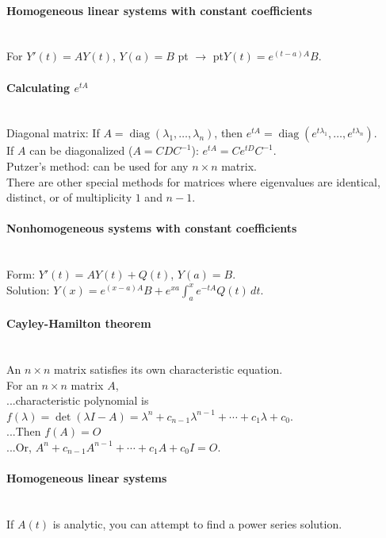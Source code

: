\documentclass[10pt]{article}
\DeclareMathOperator{\diag}{diag}
\def\yields{\hskip 5 pt $\to$ \hskip 5 pt}
\begin{document}
\paragraph{Homogeneous linear systems with constant coefficients}\ \\
For $Y'(t) = A Y(t)$, $Y(a) = B$ \yields $Y(t) = e^{(t-a)A}B$.

\paragraph{Calculating $e^{tA}$}\ \\
Diagonal matrix: If $A=\diag(\lambda_1,\dotsc,\lambda_n)$, then $e^{tA}=\diag(e^{t\lambda_1},\dotsc,e^{t\lambda_n}).$\\
If $A$ can be diagonalized ($A = CDC^{-1}$): $e^{tA} = Ce^{tD}C^{-1}$.\\
Putzer's method: can be used for any $n \times n$ matrix.\\
There are other special methods for matrices where eigenvalues are identical, distinct, or 
of multiplicity $1$ and $n-1$.

\paragraph{Nonhomogeneous systems with constant coefficients}\ \\
Form: $Y'(t) = AY(t) + Q(t)$, $Y(a) = B$.\\
Solution: $Y(x) = e^{(x-a)A}B + e^{xa} \int_a^x e^{-tA} Q(t)\, dt$.

\paragraph{Cayley-Hamilton theorem}\ \\
An $n \times n$ matrix satisfies its own characteristic equation.\\
For an $n \times n$ matrix $A$,\\
...characteristic polynomial is $f(\lambda)=\det(\lambda I-A)=\lambda^n+c_{n-1}\lambda^{n-1}+\dotsb+c_1\lambda + c_0$.\\
...Then $f(A) = O$\\
...Or, $A^n + c_{n-1}A^{n-1} + \dotsb + c_1A + c_0I = O$.

\paragraph{Homogeneous linear systems}\ \\
If $A(t)$ is analytic, you can attempt to find a power series solution.
\end{document}
